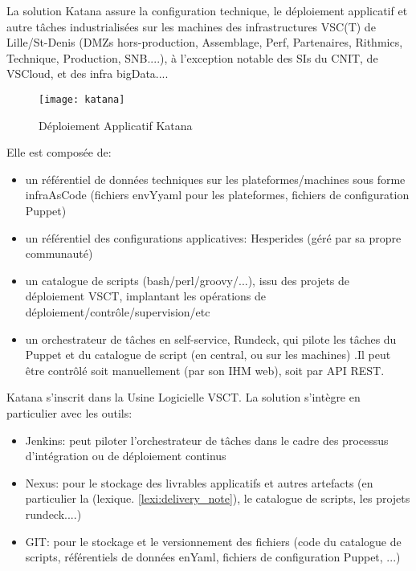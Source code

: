 La solution Katana assure la configuration technique, le déploiement applicatif et autre tâches industrialisées sur les machines des infrastructures VSC(T) de Lille/St-Denis (DMZs hors-production, Assemblage, Perf, Partenaires, Rithmics, Technique, Production, SNB....), à l'exception notable des SIs du CNIT, de VSCloud, et des infra bigData....

\begin{figure}[ht]
\centering
\texttt{[image: katana]}
\caption{Déploiement Applicatif Katana}
\end{figure}

Elle est composée de:

\begin{itemize}
  \item un référentiel de données techniques sur les plateformes/machines sous forme infraAsCode (fichiers envYyaml pour les plateformes, fichiers de configuration Puppet)
  \item un référentiel des configurations applicatives: Hesperides (géré par sa propre communauté)
  \item un catalogue de scripts (bash/perl/groovy/...), issu des projets de déploiement VSCT, implantant les opérations de déploiement/contrôle/supervision/etc
  \item un orchestrateur de tâches en self-service, Rundeck, qui pilote les tâches du Puppet et du catalogue de script (en central, ou sur les machines) .Il peut être contrôlé soit manuellement (par son IHM web), soit par API REST.
\end{itemize}

Katana s'inscrit dans la Usine Logicielle VSCT. La solution s'intègre en particulier avec les outils:
\begin{itemize}
  \item Jenkins: peut piloter l'orchestrateur de tâches dans le cadre des processus d'intégration ou de déploiement continus
  \item Nexus: pour le stockage des livrables applicatifs et autres artefacts (en particulier la (lexique. \ref{lexi:delivery_note}), le catalogue de scripts, les projets rundeck....)
  \item GIT: pour le stockage et le versionnement des fichiers (code du catalogue de scripts, référentiels de données enYaml, fichiers de configuration Puppet, ...)
\end{itemize}
